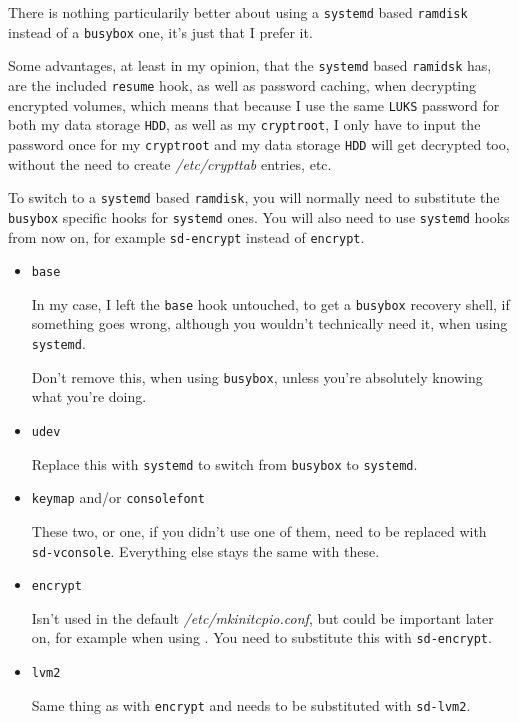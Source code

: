 \documentclass[10pt]{dustdoc}
\begin{document}
\begin{NOTE}
    There is nothing particularily better about using a \texttt{systemd} based \texttt{ramdisk} instead of a \texttt{busybox} one, it’s just that I prefer it.

    Some advantages, at least in my opinion, that the \texttt{systemd} based \texttt{ramidsk} has, are the included \texttt{resume} hook, as well as password caching, when decrypting encrypted volumes, which means that because I use the same \texttt{LUKS} password for both my data storage \texttt{HDD}, as well as my \texttt{cryptroot}, I only have to input the password once for my \texttt{cryptroot} and my data storage \texttt{HDD} will get decrypted too, without the need to create \textit{/etc/crypttab} entries, etc.
\end{NOTE}

To switch to a \texttt{systemd} based \texttt{ramdisk}, you will normally need to substitute the \texttt{busybox} specific hooks for \texttt{systemd} ones.
You will also need to use \texttt{systemd} hooks from now on, for example \texttt{sd-encrypt} instead of \texttt{encrypt}.

\begin{itemize}
    \item \texttt{base}

        In my case, I left the \texttt{base} hook untouched, to get a \texttt{busybox} recovery shell, if something goes wrong, although you wouldn’t technically need it, when using \texttt{systemd}.

        \begin{WARNING}
            Don’t remove this, when using \texttt{busybox}, unless you’re absolutely knowing what you’re doing.
        \end{WARNING}

    \item \texttt{udev}

        Replace this with \texttt{systemd} to switch from \texttt{busybox} to \texttt{systemd}.

    \item \texttt{keymap} and/or \texttt{consolefont}

        These two, or one, if you didn’t use one of them, need to be replaced with \texttt{sd-vconsole}.
        Everything else stays the same with these.

    \item \texttt{encrypt}

        Isn’t used in the default \textit{/etc/mkinitcpio.conf}, but could be important later on, for example when using .
        You need to substitute this with \texttt{sd-encrypt}.

    \item \texttt{lvm2}

        Same thing as with \texttt{encrypt} and needs to be substituted with \texttt{sd-lvm2}.
\end{itemize}
\end{document}
